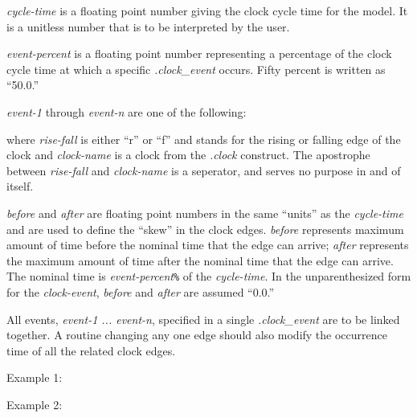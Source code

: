{\begin{pespace}
\begin{description}
\item {\em cycle-time} is a floating point number giving the clock cycle
time for the model.  It is a unitless number that is to be interpreted by
the user.

\item {\em event-percent} is a floating point number representing a
percentage of the clock cycle time at which a specific {\em .clock\_event}
occurs.  Fifty percent is written as ``50.0.''

\item {\em event-1} through {\em event-n} are one of the following:
where {\em rise-fall} is either ``r'' or ``f'' and stands for the rising or
falling edge of the clock and {\em clock-name} is a clock from the {\em
.clock} construct.  The apostrophe between {\em rise-fall} and {\em
clock-name} is a seperator, and serves no purpose in and of itself.

\item {\em before} and {\em after} are floating point numbers in the same
``units'' as the {\em cycle-time} and are used to define the ``skew'' in the
clock edges.  {\em before} represents maximum amount of time before the
nominal time that the edge can arrive; {\em after} represents the maximum
amount of time after the nominal time that the edge can arrive.  The nominal
time is {\em event-percent}{\verb|%|} of the {\em cycle-time}.  In the
unparenthesized form for the {\em clock-event}, {\em before} and {\em after}
are assumed ``0.0.''
\end{description}

All events, {\em event-1 ... event-n}, specified in a single {\em
.clock\_event} are to be linked together.  A routine changing any one edge
should also modify the occurrence time of all the related clock edges.  

Example 1:

Example 2:


\end{pespace}}
